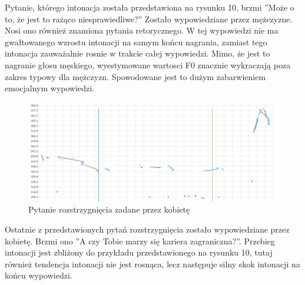 \documentclass[a4paper,12 pt]{article}
\begin{document}
\FloatBarrier
Pytanie, którego intonacja została przedstawiona na rysunku 10, brzmi ''Może o to, że jest to rażąco niesprawiedliwe?'' Zostało wypowiedziane przez mężczyzne. Nosi ono również znamiona pytania retorycznego.  W tej wypowiedzi nie ma gwałtowanego wzrostu intonacji na samym końcu nagrania, zamiast tego intonacja zauważalnie rosnie w trakcie całej wypowiedzi. Mimo, że jest to nagranie głosu męskiego, wyestymowane wartosci F0 znacznie wykraczają poza zakres typowy dla mężczyzn. Spowodowane jest to dużym zabarwieniem emocjalnym wypowiedzi.

 \FloatBarrier
\begin{figure}[h]
\centering
\includegraphics[scale=0.7]{pytanie_rozstrzygniecia_3_kobieta.png}
\caption{Pytanie rozstrzygnięcia zadane przez kobietę}
\end{figure}
\FloatBarrier
Ostatnie z przedstawionych pytań rozstrzygnięcia zostało wypowiedziane przez kobietę. Brzmi ono ''A czy Tobie marzy się kariera zagraniczna?''.  Przebieg intonacji jest zbliżony do przykładu przedstawionego na rysunku 10, tutaj również tendencja intonacji nie jest rosnąca, lecz następuje silny skok intonacji na końcu wypowiedzi.
\end{document}
